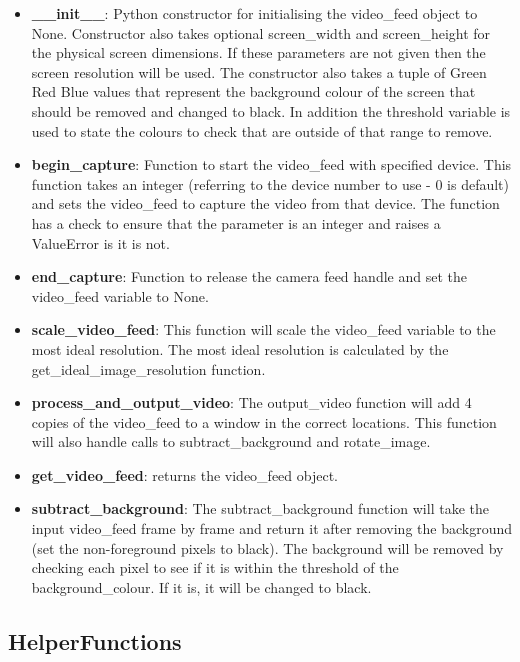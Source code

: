 \documentclass{article}
\begin{document}
\begin{itemize}
	\item \textbf{\_\_init\_\_}: Python constructor for initialising the video\_feed object to None. Constructor also takes optional screen\_width and screen\_height for the physical screen dimensions. If these parameters are not given then the screen resolution will be used. The constructor also takes a tuple of Green Red Blue values that represent the background colour of the screen that should be removed and changed to black. In addition the threshold variable is used to state the colours to check that are outside of that range to remove.
	
	\item \textbf{begin\_capture}: Function to start the video\_feed with specified device. This function takes an integer (referring to the device number to use - 0 is default) and sets the video\_feed to capture the video from that device. The function has a check to ensure that the parameter is an integer and raises a ValueError is it is not.
	
	\item \textbf{end\_capture}: Function to release the camera feed handle and set the video\_feed variable to None. 
	
	\item \textbf{scale\_video\_feed}: This function will scale the video\_feed variable to the most ideal resolution. The most ideal resolution is calculated by the get\_ideal\_image\_resolution function. 
	
	\item \textbf{process\_and\_output\_video}: The output\_video function will add  4 copies of the video\_feed to a window in the correct locations. This function will also handle calls to subtract\_background and rotate\_image.
	
	\item \textbf{get\_video\_feed}: returns the video\_feed object.   

	\item \textbf{subtract\_background}: The subtract\_background function will take the input video\_feed frame by frame and return it after removing the background (set the non-foreground pixels to black). The background will be removed by checking each pixel to see if it is within the threshold of the background\_colour. If it is, it will be changed to black.

\end{itemize}


\subsection{HelperFunctions}
\end{document}
